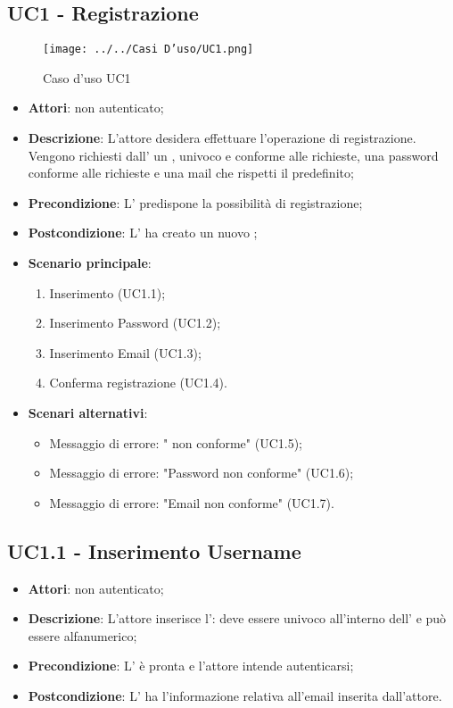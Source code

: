 \subsection{UC1 - Registrazione}
\label{ssec:UC1}
\begin{figure}[h!]
\centering
\texttt{[image: ../../Casi D'uso/UC1.png]}
\caption{Caso d'uso UC1}
 \end{figure}
\begin{itemize}
\item \textbf{Attori}:  non autenticato;
\item \textbf{Descrizione}: L'attore desidera effettuare l'operazione di registrazione. Vengono richiesti dall' un , univoco e conforme alle richieste, una password conforme alle richieste e una mail che rispetti il  predefinito;
\item \textbf{Precondizione}: L' predispone la possibilità di registrazione;
\item \textbf{Postcondizione}: L' ha creato un nuovo  ;
\item \textbf{Scenario principale}: \begin{enumerate}\item Inserimento  (UC1.1);\item Inserimento Password (UC1.2);\item Inserimento Email (UC1.3);\item Conferma registrazione (UC1.4).
\end{enumerate}
\item \textbf{Scenari alternativi}:
	\begin{itemize}
	\item Messaggio di errore: " non conforme" (UC1.5);\item Messaggio di errore: "Password non conforme" (UC1.6);\item Messaggio di errore: "Email non conforme" (UC1.7).
	\end{itemize}
\end{itemize}
\subsection{UC1.1 - Inserimento Username}
\label{ssec:UC1.1}
\begin{itemize}
\item \textbf{Attori}:  non autenticato;
\item \textbf{Descrizione}: L’attore inserisce l': deve essere univoco all'interno dell' e può essere alfanumerico;
\item \textbf{Precondizione}: L' è pronta e l'attore intende autenticarsi;
\item \textbf{Postcondizione}: L' ha l’informazione relativa all'email inserita dall’attore.
\end{itemize}
